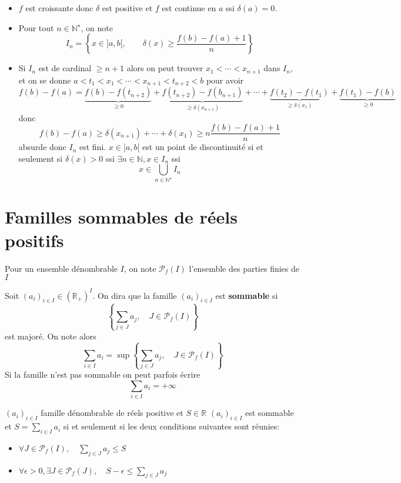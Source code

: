 \begin{itemize}
    \item $f$ est croissante donc $\delta$ est positive et $f$ est continue en $a$ ssi $\delta(a)=0$.
    \item Pour tout $n\in\mathbb N^\star$, on note \[
            I_n= \left\{ x\in ]a, b[, \qquad \delta(x)\geq \frac{f(b)-f(a)+1}n \right\}
        \]
    \item Si $I_n$ est de cardinal $\geq n+1$ alors on peut trouver $x_1< \cdots< x_{n+1}$ dans $I_n$, et on se donne $a<t_1<x_1<\cdots <x_{n+1}<t_{n+2}<b$ pour avoir \[
            f(b)-f(a)=\underbrace{f(b)-f(t_{n+2})}_{\geq 0}+\underbrace{f(t_{n+2})-f(b_{n+1})}_{\geq \delta(x_{n+1})} +\cdots +\underbrace{f(t_2)-f(t_1)}_{\geq \delta(x_1)}+\underbrace{f(t_1)-f(b)}_{\geq 0}
        \]
        donc \[
            f(b)-f(a)\geq \delta(x_{n+1})+\cdots +\delta(x_1)\geq n\frac{f(b)-f(a)+1}n
        \]
        absurde donc $I_n$ est fini. $x\in ]a, b[$ est un point de discontinuité si et seulement si $\delta(x)>0$ ssi $\exists n\in\mathbb N, x\in I_n$ ssi \[
            x\in \bigcup_{n\in\mathbb N^\star}I_n
        \]
\end{itemize}

\section{Familles sommables de réels positifs}

Pour un ensemble dénombrable $I$, on note $\mathcal P_f(I)$ l'ensemble des parties finies de $I$

\begin{dfn}
    Soit $(a_i)_{i\in I}\in (\mathbb R_+)^I$. On dira que la famille $(a_i)_{i\in I}$ est \textbf{sommable} si \[
        \left\{ \sum_{j\in J}a_j, \quad J\in\mathcal P_f(I) \right\}
    \]
    est majoré. On note alors \[
        \sum_{i\in I}a_i=\sup\left\{ \sum_{j\in J}a_j, \quad J\in\mathcal P_f(I) \right\}
    \]
    Si la famille n'est pas sommable on peut parfois écrire \[
        \sum_{i\in I}a_i=+\infty
    \]
\end{dfn}

\begin{prop}
    \Hyp $(a_i)_{i\in I}$ famille dénombrable de réels positive et $S\in \mathbb R$
    \Conc $(a_i)_{i\in I}$ est sommable et $S=\sum_{i\in I}a_i$ si et seulement si les deux conditions suivantes sont réunies: \begin{itemize}[left=2cm]
        \item $\forall J\in\mathcal P_f(I), \quad \displaystyle \sum_{j\in J}a_j\leq S$
        \item $\displaystyle \forall \epsilon>0, \exists J\in\mathcal P_f(J), \quad S-\epsilon\leq \sum_{j\in J}a_j$
    \end{itemize}
\end{prop}

